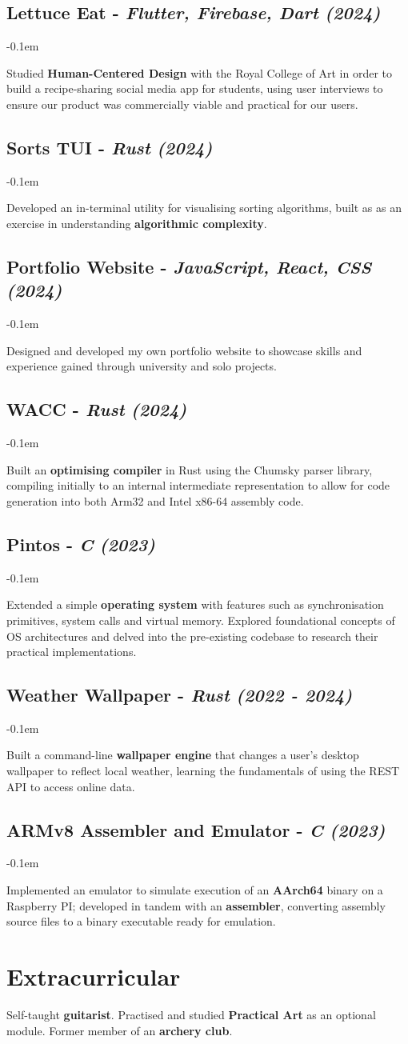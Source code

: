 \documentclass{article}
\newcommand{\dates}[1]{\hfill\textit{(#1)}}
\newcommand{\indentsubsection}[2]{
    \subsection*{#1}
    #2
}
\newcommand{\project}[4]{
    \indentsubsection{\textbf{#1} - \textit{#3} \dates{#2}}
    \vspace{-0.1em}
    \begin{minipage}{\dimexpr\textwidth}%
        #4
    \end{minipage}    
    \hfill
    \vspace{-0.2em}
}
\begin{document}
\project{Lettuce Eat }{2024}{Flutter, Firebase, Dart}{
    Studied \textbf{Human-Centered Design} with the Royal College of Art in order to build a recipe-sharing social media app for students,
    using user interviews to ensure our product was commercially viable and practical for our users.
}

\project{Sorts TUI}{2024}{Rust}{
    Developed an in-terminal utility for visualising sorting algorithms, built as as an exercise in understanding \textbf{algorithmic complexity}.
}

\project{Portfolio Website}{2024}{JavaScript, React, CSS}{
    Designed and developed my own portfolio website to showcase skills and experience gained through university and solo projects.
}

\project{WACC }{2024}{Rust}{
    Built an \textbf{optimising compiler} in Rust using the Chumsky parser library, compiling initially to an 
    internal intermediate representation to allow for code generation into both Arm32 and Intel x86-64 assembly code.
}

\project{Pintos }{2023}{C}{
    Extended a simple \textbf{operating system} with features such as synchronisation primitives, 
    system calls and virtual memory. Explored foundational concepts of OS architectures and delved into the
    pre-existing codebase to research their practical implementations. 
}

\project{Weather Wallpaper}{2022 - 2024}{Rust}{
    Built a command-line \textbf{wallpaper engine} that changes a user's desktop wallpaper to reflect local weather, learning the fundamentals 
    of using the REST API to access online data.
}

\project{ARMv8 Assembler and Emulator}{2023}{C} {
    Implemented an emulator to simulate execution of an \textbf{AArch64} binary on a Raspberry PI; developed in tandem with an \textbf{assembler},
    converting assembly source files to a binary executable ready for emulation. 
}




\section*{Extracurricular}
Self-taught \textbf{guitarist}. 
Practised and studied \textbf{Practical Art} as an optional module.
Former member of an \textbf{archery club}.

\vspace{0.35em}
\end{document}
